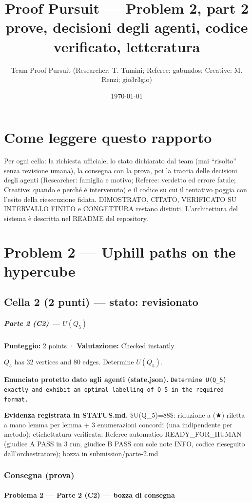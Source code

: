 \documentclass[11pt,a4paper]{article}
\title{Proof Pursuit --- Problem 2, part 2\\ \large prove, decisioni degli agenti, codice verificato, letteratura}
\author{Team Proof Pursuit (Researcher: T. Tumini; Referee: gabundos; Creative: M. Renzi; gio3r3gio)}
\date{\today}
\begin{document}
\maketitle\tableofcontents
\section*{Come leggere questo rapporto}
Per ogni cella: la richiesta ufficiale, lo stato dichiarato dal team (mai ``risolto'' senza revisione umana), la consegna
con la prova, poi la traccia delle decisioni degli agenti (Researcher: famiglia e motivo; Referee: verdetto ed errore
fatale; Creative: quando e perché è intervenuto) e il codice su cui il tentativo poggia con l'esito della riesecuzione
fidata. DIMOSTRATO, CITATO, VERIFICATO SU INTERVALLO FINITO e CONGETTURA restano distinti. L'architettura del sistema
è descritta nel README del repository.
\section{Problem 2 — Uphill paths on the hypercube}
\subsection{Cella 2 (2 punti) — stato: revisionato}
\subparagraph{\texorpdfstring{Parte 2 (C2) ---
\(U(Q_5)\)}{Parte 2 (C2) --- U(Q\_5)}}\label{parte-2-c2-uq_5}

\textbf{Punteggio:} 2 points · \textbf{Valutazione:} Checked instantly

\(Q_5\) has \(32\) vertices and \(80\) edges. Determine \(U(Q_5)\).

\textbf{Enunciato protetto dato agli agenti (state.json).} \texttt{Determine U(Q\_5) exactly and exhibit an optimal labelling of Q\_5 in the required format.}

\textbf{Evidenza registrata in STATUS.md.} \$U(Q\_5)=88\$: riduzione a (★) riletta a mano lemma per lemma + 3 enumerazioni concordi (una indipendente per metodo); etichettatura verificata; Referee automatico READY\_FOR\_HUMAN (giudice A PASS in 3 run, giudice B PASS con sole note INFO, codice rieseguito dall'orchestratore); bozza in submission/parte-2.md

\subsubsection{Consegna (prova)}
\paragraph{Problema 2 --- Parte 2 (C2) --- bozza di
consegna}\label{problema-2-parte-2-c2-bozza-di-consegna}
\end{document}
